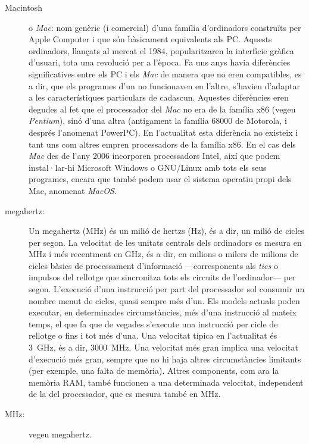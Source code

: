 \begin{description}
\item[Macintosh] o \emph{Mac}: nom genèric (i comercial) d'una família
  d'ordinadors construïts per Apple Computer i que són bàsicament
  equivalents als PC. Aquests ordinadors, llançats al mercat el 1984,
  popularitzaren la interfície gràfica d'usuari, tota una revolució
  per a l'època. Fa uns anys havia diferències significatives entre
  els PC i els \emph{Mac} de manera que no eren compatibles, es a dir,
  que els programes d'un no funcionaven en l'altre, s'havien d'adaptar
  a les característiques particulars de cadascun. Aquestes diferències
  eren degudes al fet que el processador del \emph{Mac} no era de la
  família x86 (vegeu \emph{Pentium}), sinó d'una altra (antigament la
  família 68000 de Motorola, i després l'anomenat PowerPC). En
  l'actualitat esta diferència no existeix i tant uns com altres
  empren processadors de la família x86. En el cas dels \emph{Mac} des
  de l'any 2006 incorporen processadors Intel, així que podem
  instal·lar-hi Microsoft Windows o GNU/Linux amb tots els seus
  programes, encara que també podem usar el sistema operatiu propi
  dels Mac, anomenat \emph{MacOS}.
  
\item[megahertz:] Un megahertz (MHz) és un milió de hertzs (Hz),
  és a dir, un milió de cicles per segon. La velocitat de les
  unitats centrals dels ordinadors es mesura en MHz i més recentment
  en GHz, és a dir, en milions o milers de milions de cicles
  bàsics de processament d'informació ---corresponents als \emph{tics}
  o impulsos del rellotge que sincronitza tots els circuits de
  l'ordinador--- per segon.  L'execució d'una instrucció per part del
  processador sol consumir un nombre menut de cicles, quasi sempre
  més d'un. Els models actuals poden executar, en determinades
  circumstàncies, més d'una instrucció al mateix temps, el que fa que de
  vegades s'execute una instrucció per cicle de rellotge o fins i tot
  més d'una.  Una velocitat típica en l'actualitat és 3~GHz, és a
  dir, 3000~MHz. Una velocitat més gran implica una velocitat
  d'execució més gran, sempre que no hi haja altres circumstàncies
  limitants (per exemple, una falta de memòria).  Altres components,
  com ara la memòria RAM, també funcionen a una determinada velocitat,
  independent de la del processador, que es mesura també en MHz.


\item[MHz:] vegeu megahertz.
  

\end{description}
